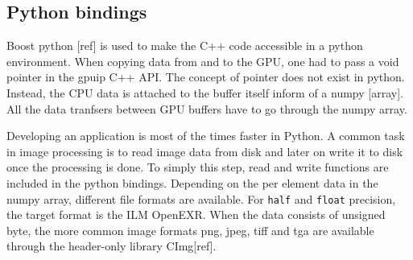 \subsection{Python bindings}

Boost python [ref] is used to make the C++ code accessible in a python environment. When copying data from and to the GPU, one had to pass a void pointer in the gpuip C++ API. The concept of pointer does not exist in python. Instead, the CPU data is attached to the buffer itself inform of a numpy [array]. All the data tranfsers between GPU buffers have to go through the numpy array.
\newline

Developing an application is most of the times faster in Python. A common task in image processing is to read image data from disk and later on write it to disk once the processing is done. To simply this step, read and write functions are included in the python bindings. Depending on the per element data in the numpy array, different file formats are available. For {\tt half} and {\tt float} precision, the target format is the ILM OpenEXR. When the data consists of unsigned byte, the more common image formats png, jpeg, tiff and tga are available through the header-only library CImg[ref].  
